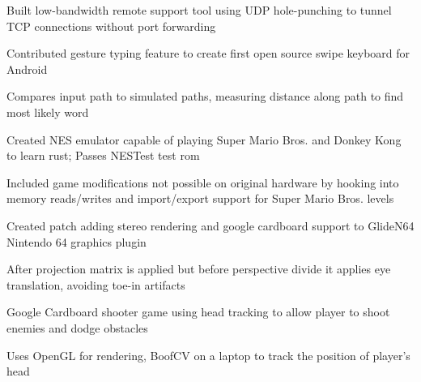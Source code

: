 \documentclass[12pt]{jmichaud-resume}
\begin{document}
\begin{minipage}[t]{0.65\textwidth}
\begin{tightemize}
	\item Built low-bandwidth remote support tool using UDP hole-punching to tunnel TCP connections without port forwarding
\end{tightemize}
\sectionsep

 \hfill {}

\sectionsep

 \hfill
{}
\begin{tightemize}
	\item Contributed gesture typing feature to create first open source swipe keyboard for Android
	\item Compares input path to simulated paths, measuring distance along path to find most likely word
\end{tightemize}

\sectionsep

 \hfill
{}
\begin{tightemize}
	\item Created NES emulator capable of playing Super Mario Bros. and Donkey Kong to learn rust; Passes NESTest test rom
	\item Included game modifications not possible on original hardware by hooking into memory reads/writes and import/export support for Super Mario Bros. levels
\end{tightemize}

\sectionsep
\iftrue
{} \hfill
{}
\begin{tightemize}
	\item Created patch adding stereo rendering and google cardboard support to GlideN64 Nintendo 64 graphics plugin
	\item After projection matrix is applied but before perspective divide it applies eye translation, avoiding toe-in artifacts
\end{tightemize}
\sectionsep
\fi

\iftrue
{} \hfill
{}
\begin{tightemize}
	\item Google Cardboard shooter game using head tracking to allow player to shoot enemies and dodge obstacles
	\item Uses OpenGL for rendering, BoofCV on a laptop to track the position of player’s head
\end{tightemize}
\sectionsep
\fi


\end{minipage}
\end{document}
